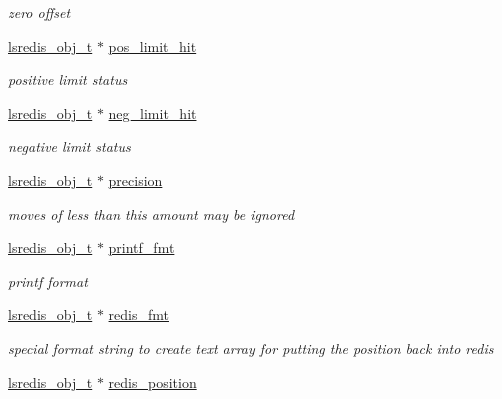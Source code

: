 \begin{DoxyCompactItemize}
\begin{DoxyCompactList}\small\item\em zero offset \end{DoxyCompactList}\item 
\hyperlink{pgpmac_8h_ad449de06d02791adf2498d2a1e1f909c}{lsredis\-\_\-obj\-\_\-t} $\ast$ \hyperlink{structlspmac__motor__struct_af39d2e7a681d7c2fbdc39d53fab1a475}{pos\-\_\-limit\-\_\-hit}
\begin{DoxyCompactList}\small\item\em positive limit status \end{DoxyCompactList}\item 
\hyperlink{pgpmac_8h_ad449de06d02791adf2498d2a1e1f909c}{lsredis\-\_\-obj\-\_\-t} $\ast$ \hyperlink{structlspmac__motor__struct_afe13c86941928d20357f4f3e2a4d915a}{neg\-\_\-limit\-\_\-hit}
\begin{DoxyCompactList}\small\item\em negative limit status \end{DoxyCompactList}\item 
\hyperlink{pgpmac_8h_ad449de06d02791adf2498d2a1e1f909c}{lsredis\-\_\-obj\-\_\-t} $\ast$ \hyperlink{structlspmac__motor__struct_a411f12c0ecdc481687d4fbbbec4c5510}{precision}
\begin{DoxyCompactList}\small\item\em moves of less than this amount may be ignored \end{DoxyCompactList}\item 
\hyperlink{pgpmac_8h_ad449de06d02791adf2498d2a1e1f909c}{lsredis\-\_\-obj\-\_\-t} $\ast$ \hyperlink{structlspmac__motor__struct_a25b13b65baf1b28c34012850809b0a3a}{printf\-\_\-fmt}
\begin{DoxyCompactList}\small\item\em printf format \end{DoxyCompactList}\item 
\hyperlink{pgpmac_8h_ad449de06d02791adf2498d2a1e1f909c}{lsredis\-\_\-obj\-\_\-t} $\ast$ \hyperlink{structlspmac__motor__struct_a91c38b2072d878b71f4e77de2f1375a4}{redis\-\_\-fmt}
\begin{DoxyCompactList}\small\item\em special format string to create text array for putting the position back into redis \end{DoxyCompactList}\item 
\hyperlink{pgpmac_8h_ad449de06d02791adf2498d2a1e1f909c}{lsredis\-\_\-obj\-\_\-t} $\ast$ \hyperlink{structlspmac__motor__struct_af94a0b2611136058ead4948fd7c858e3}{redis\-\_\-position}

\end{DoxyCompactItemize}
